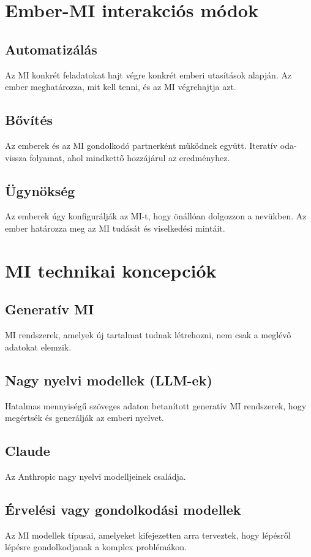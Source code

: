 \documentclass[a4paper, 11pt]{article}
\begin{document}
\begin{multicols}{2}
\section{Ember-MI interakciós módok}

\subsection{Automatizálás}
Az MI konkrét feladatokat hajt végre konkrét emberi utasítások alapján. Az ember meghatározza, mit kell tenni, és az MI végrehajtja azt.

\subsection{Bővítés}
Az emberek és az MI gondolkodó partnerként működnek együtt. Iteratív oda-vissza folyamat, ahol mindkettő hozzájárul az eredményhez.

\subsection{Ügynökség}
Az emberek úgy konfigurálják az MI-t, hogy önállóan dolgozzon a nevükben. Az ember határozza meg az MI tudását és viselkedési mintáit.

\section{MI technikai koncepciók}

\subsection{Generatív MI}
MI rendszerek, amelyek új tartalmat tudnak létrehozni, nem csak a meglévő adatokat elemzik.

\subsection{Nagy nyelvi modellek (LLM-ek)}
Hatalmas mennyiségű szöveges adaton betanított generatív MI rendszerek, hogy megértsék és generálják az emberi nyelvet.

\subsection{Claude}
Az Anthropic nagy nyelvi modelljeinek családja.

\subsection{Érvelési vagy gondolkodási modellek}
Az MI modellek típusai, amelyeket kifejezetten arra terveztek, hogy lépésről lépésre gondolkodjanak a komplex problémákon.


\end{multicols}
\end{document}
